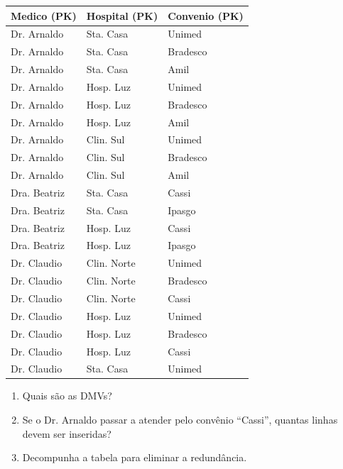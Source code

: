 \documentclass[12pt]{article}
\begin{document}
\begin{enumerate}[label=\textbf{Questão \arabic*:}, leftmargin=*]
  \vspace{0.2cm}
  \small
  \begin{tabular}{|l|l|l|}
    \hline
    \textbf{Medico (PK)} & \textbf{Hospital (PK)} & \textbf{Convenio (PK)} \\ \hline
    Dr. Arnaldo & Sta. Casa   & Unimed  \\ \hline
    Dr. Arnaldo & Sta. Casa   & Bradesco \\ \hline
    Dr. Arnaldo & Sta. Casa   & Amil     \\ \hline
    Dr. Arnaldo & Hosp. Luz   & Unimed  \\ \hline
    Dr. Arnaldo & Hosp. Luz   & Bradesco \\ \hline
    Dr. Arnaldo & Hosp. Luz   & Amil     \\ \hline
    Dr. Arnaldo & Clin. Sul   & Unimed  \\ \hline
    Dr. Arnaldo & Clin. Sul   & Bradesco \\ \hline
    Dr. Arnaldo & Clin. Sul   & Amil     \\ \hline
    Dra. Beatriz & Sta. Casa   & Cassi    \\ \hline
    Dra. Beatriz & Sta. Casa   & Ipasgo   \\ \hline
    Dra. Beatriz & Hosp. Luz   & Cassi    \\ \hline
    Dra. Beatriz & Hosp. Luz   & Ipasgo   \\ \hline
    Dr. Claudio  & Clin. Norte & Unimed   \\ \hline
    Dr. Claudio  & Clin. Norte & Bradesco \\ \hline
    Dr. Claudio  & Clin. Norte & Cassi    \\ \hline
    Dr. Claudio  & Hosp. Luz   & Unimed   \\ \hline
    Dr. Claudio  & Hosp. Luz   & Bradesco \\ \hline
    Dr. Claudio  & Hosp. Luz   & Cassi    \\ \hline
    Dr. Claudio  & Sta. Casa   & Unimed   \\ \hline
  \end{tabular}
  
  \vspace{0.2cm}
  \begin{enumerate}[label=\alph*)]
    \item Quais são as DMVs?
    \item Se o Dr. Arnaldo passar a atender pelo convênio ``Cassi'', quantas linhas devem ser inseridas?
    \item Decompunha a tabela para eliminar a redundância.
  \end{enumerate}
  \begin{resposta}
  \end{resposta}


\end{enumerate}
\end{document}
